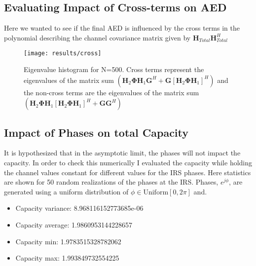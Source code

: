 \documentclass[12pt,a4paper]{report}
\begin{document}
\subsection{Evaluating Impact of Cross-terms on AED}
Here we wanted to see if the final AED is influenced by the cross terms in the polynomial describing the channel
covariance matrix given by $\mathbf{H}_{Total}\mathbf{H}_{Total}^H$

\begin{figure}[H]
	\texttt{[image: results/cross]}
\caption{Eigenvalue histogram for N=500. Cross terms represent the eigenvalues of the matrix sum $(\mathbf{H}_{2}\boldsymbol{\Phi}\mathbf{H}_{1}\mathbf{G}^H + \mathbf{G}[\mathbf{H}_{2}\boldsymbol{\Phi}\mathbf{H}_{1}]^H)$ and the non-cross terms are the eigenvalues of the matrix sum $(\mathbf{H}_{2}\boldsymbol{\Phi}\mathbf{H}_{1}[\mathbf{H}_{2}\boldsymbol{\Phi}\mathbf{H}_{1}]^H + \mathbf{G}\mathbf{G}^H)$}
\label{irs_figure}
\end{figure}

\subsection{Impact of Phases on total Capacity}
It is hypothesized that in the asymptotic limit, the phases will not impact the capacity. In order to check this numerically I evaluated the capacity while holding the channel values constant for different values for the IRS phases. Here statistics are shown for 50 random realizations of the phases at the IRS. 
Phases, $e^{j\phi}$, are generated using a uniform distribution of $\phi \in \text{Uniform}[0,2\pi]$ and.
\begin{itemize}
\item 
Capacity variance:
 8.968116152773685e-06
\item 
Capacity average:
 1.9860953144228657
\item 
Capacity min:
 1.9783515328782062
\item 
Capacity max:
 1.993849732554225
\end{itemize}







	

	
	




\end{document}
